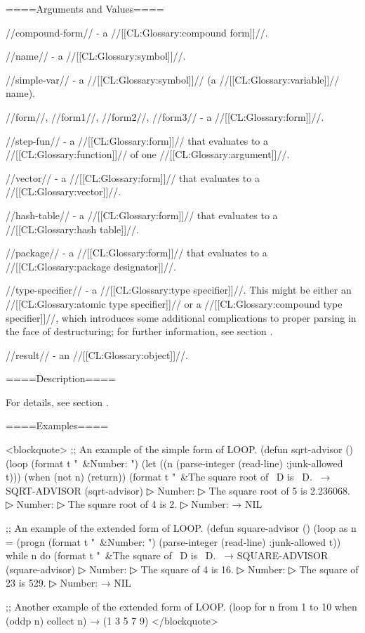 ====Arguments and Values====

//compound-form// - a //[[CL:Glossary:compound form]]//.

//name// - a //[[CL:Glossary:symbol]]//.

//simple-var// - a //[[CL:Glossary:symbol]]// (a //[[CL:Glossary:variable]]// name).

//form//, //form1//, //form2//, //form3// - a //[[CL:Glossary:form]]//.

//step-fun// - a //[[CL:Glossary:form]]// that evaluates to a //[[CL:Glossary:function]]// of one //[[CL:Glossary:argument]]//.

//vector// - a //[[CL:Glossary:form]]// that evaluates to a //[[CL:Glossary:vector]]//.

//hash-table// - a //[[CL:Glossary:form]]// that evaluates to a //[[CL:Glossary:hash table]]//.

//package// - a //[[CL:Glossary:form]]// that evaluates to a //[[CL:Glossary:package designator]]//.

//type-specifier// - a //[[CL:Glossary:type specifier]]//. This might be either an //[[CL:Glossary:atomic type specifier]]// or a //[[CL:Glossary:compound type specifier]]//, which introduces some additional complications to proper parsing in the face of destructuring; for further information, see section {\secref\DestructuringLOOPVars}.

//result// - an //[[CL:Glossary:object]]//.

====Description====

For details, see section {\secref\LoopFacility}.

====Examples====

<blockquote> ;; An example of the simple form of LOOP. (defun sqrt-advisor () (loop (format t "~&Number: ") (let ((n (parse-integer (read-line) :junk-allowed t))) (when (not n) (return)) (format t "~&The square root of ~D is ~D.~ → SQRT-ADVISOR (sqrt-advisor)
▷ Number: \IN{5\CRLF}
▷ The square root of 5 is 2.236068.
▷ Number: \IN{4\CRLF}
▷ The square root of 4 is 2.
▷ Number:  → NIL

;; An example of the extended form of LOOP. (defun square-advisor () (loop as n = (progn (format t "~&Number: ") (parse-integer (read-line) :junk-allowed t)) while n do (format t "~&The square of ~D is ~D.~ → SQUARE-ADVISOR (square-advisor)
▷ Number: \IN{4\CRLF}
▷ The square of 4 is 16.
▷ Number: \IN{23\CRLF}
▷ The square of 23 is 529.
▷ Number:  → NIL

;; Another example of the extended form of LOOP. (loop for n from 1 to 10 when (oddp n) collect n) → (1 3 5 7 9) </blockquote>

